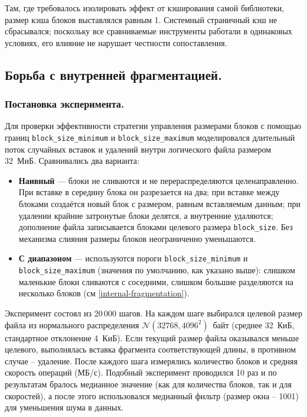 Там, где требовалось изолировать эффект от кэширования самой библиотеки, размер кэша блоков выставлялся равным 1. Системный страничный кэш не сбрасывался; поскольку все сравниваемые инструменты работали в одинаковых условиях, его влияние не нарушает честности сопоставления.

\subsection{Борьба с внутренней фрагментацией.}

\subsubsection{Постановка эксперимента.}
Для проверки эффективности стратегии управления размерами блоков с помощью границ \texttt{block\_size\_minimum} и \texttt{block\_size\_maximum} моделировался длительный поток случайных вставок и удалений внутри логического файла размером 32~МиБ. Сравнивались два варианта:

\begin{itemize}
    \item \textbf{Наивный} --- блоки не сливаются и не перераспределяются целенаправленно. При вставке в середину блока он разрезается на два; при вставке между блоками создаётся новый блок с размером, равным вставляемым данным; при удалении крайние затронутые блоки делятся, а внутренние удаляются; дополнение файла записывается блоками целевого размера \texttt{block\_size}. Без механизма слияния размеры блоков неограниченно уменьшаются.
    \item \textbf{С диапазоном} --- используются пороги \texttt{block\_size\_minimum} и \texttt{block\_size\_maximum} (значения по умолчанию, как указано выше): слишком маленькие блоки сливаются с соседними, слишком большие разделяются на несколько блоков (см \ref{internal-fragmentation}).
\end{itemize}

Эксперимент состоял из 20\,000 шагов. На каждом шаге выбирался целевой размер файла из нормального распределения $\mathcal{N}(32768, 4096^2)$~байт (среднее 32~КиБ, стандартное отклонение 4~КиБ). Если текущий размер файла оказывался меньше целевого, выполнялась вставка фрагмента соответствующей длины, в противном случае -- удаление. После каждого шага измерялись количество блоков и средняя скорость операций (МБ/с). Подобный эксперимент проводился 10 раз и по результатам бралось медианное значение (как для количества блоков, так и для скоростей), а после этого использовался медианный фильтр (размер окна -- 1001) для уменьшения шума в данных.

